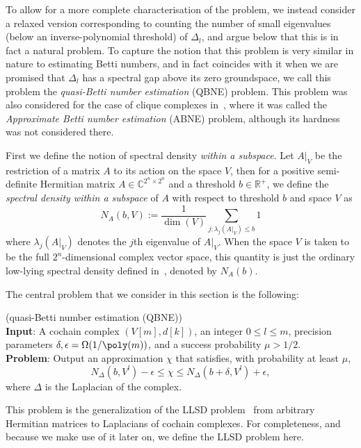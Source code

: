 \documentclass[11pt]{article}
\numberwithin{equation}{section}
\newcommand\equ[1] {\begin{equation}#1\end{equation}}
\renewcommand\( {\left(}
\renewcommand\) {\right)}
\newcounter{mycount}
\newcommand\myprob[3]{%
   \stepcounter{mycount}
 \par\noindent   {\bfseries Definition\  \themycount} (#1)\\
   {\bfseries Input}: #2\\
   {\bfseries Problem}: #3\par
}
\begin{document}
To allow for a more complete characterisation of the problem, we instead consider a relaxed version corresponding to counting the number of small eigenvalues (below an inverse-polynomial threshold) of $\Delta_l$, and argue below that this is in fact a natural problem. To capture the notion that this problem is very similar in nature to estimating Betti numbers, and in fact coincides with it when we are promised that $\Delta_l$ has a spectral gap above its zero groundspace, we call this problem the \emph{quasi-Betti number estimation} ({\sc QBNE}) problem. This problem was also considered for the case of clique complexes in~\cite{gyurik}, where it was called the \emph{Approximate Betti number estimation} ({\sc ABNE}) problem, although its hardness was not considered there. 

First we define the notion of spectral density \emph{within a subspace}. Let $A|_{V}$ be the restriction of a matrix $A$ to its action on the space $V$, then for a positive semi-definite Hermitian matrix $A \in \mathbb{C}^{2^n \times 2^n}$ and a threshold $b \in \mathbb{R^+}$, we define the \emph{spectral density within a subspace} of $A$ with respect to threshold $b$ and space $V$ as 
\equ{
	N_A(b,V) := \frac{1}{\dim(V)} \sum_{j : \lambda_j(A|_{V}) \leq b} 1
}
where $\lambda_j(A|_{V})$ denotes the $j$th eigenvalue of $A|_{V}$. When the space $V$ is taken to be the full $2^n$-dimensional complex vector space, this quantity is just the ordinary low-lying spectral density defined in~\cite{brandao_thesis}, denoted by $N_A(b)$. 

The central problem that we consider in this section is the following:\\
\myprob{\label{def:QBNE}{\sc quasi-Betti number estimation (QBNE)}}{A cochain complex $(V[m],d[k])$, an integer $0\leq l \leq m$, precision parameters $\delta, \epsilon = \Omega(1/\poly(m))$, and a success probability $\mu > 1/2$.}{Output an approximation $\chi$ that satisfies, with probability at least $\mu$, \equ{\label{eq:quasi_betti_number_estimation}N_\Delta(b,V^l) - \epsilon \leq \chi \leq N_\Delta(b+\delta,V^l) + \epsilon,} where $\Delta$ is the Laplacian of the complex.\\}

\noindent This problem is the generalization of the {\sc LLSD} problem~\cite{gyurik} from arbitrary Hermitian matrices to Laplacians of cochain complexes. For completeness, and because we make use of it later on, we define the {\sc LLSD} problem here.\\
\end{document}
